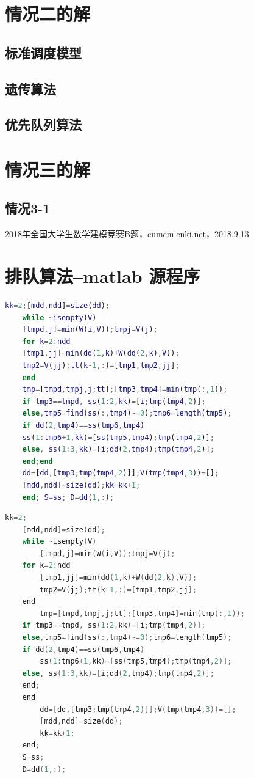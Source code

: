 \documentclass{cumcmthesis}
\begin{document}
	\section{情况二的解}
	\subsection{标准调度模型}
	\subsection{遗传算法}
	\subsection{优先队列算法}
	
	\section{情况三的解}
	\subsection{情况3-1}
	
	\begin{thebibliography}{9}
		 2018年全国大学生数学建模竞赛B题，cumcm.cnki.net，2018.9.13
	\end{thebibliography}
	
	\newpage
	\appendix
	\section{排队算法--matlab 源程序}
	\begin{lstlisting}[language=matlab]
	kk=2;[mdd,ndd]=size(dd);
	while ~isempty(V)
	[tmpd,j]=min(W(i,V));tmpj=V(j);
	for k=2:ndd
	[tmp1,jj]=min(dd(1,k)+W(dd(2,k),V));
	tmp2=V(jj);tt(k-1,:)=[tmp1,tmp2,jj];
	end
	tmp=[tmpd,tmpj,j;tt];[tmp3,tmp4]=min(tmp(:,1));
	if tmp3==tmpd, ss(1:2,kk)=[i;tmp(tmp4,2)];
	else,tmp5=find(ss(:,tmp4)~=0);tmp6=length(tmp5);
	if dd(2,tmp4)==ss(tmp6,tmp4)
	ss(1:tmp6+1,kk)=[ss(tmp5,tmp4);tmp(tmp4,2)];
	else, ss(1:3,kk)=[i;dd(2,tmp4);tmp(tmp4,2)];
	end;end
	dd=[dd,[tmp3;tmp(tmp4,2)]];V(tmp(tmp4,3))=[];
	[mdd,ndd]=size(dd);kk=kk+1;
	end; S=ss; D=dd(1,:);
	 \end{lstlisting}
	\begin{lstlisting}[language=c]
	kk=2;
	[mdd,ndd]=size(dd);
	while ~isempty(V)
		[tmpd,j]=min(W(i,V));tmpj=V(j);
	for k=2:ndd
		[tmp1,jj]=min(dd(1,k)+W(dd(2,k),V));
		tmp2=V(jj);tt(k-1,:)=[tmp1,tmp2,jj];
	end
		tmp=[tmpd,tmpj,j;tt];[tmp3,tmp4]=min(tmp(:,1));
	if tmp3==tmpd, ss(1:2,kk)=[i;tmp(tmp4,2)];
	else,tmp5=find(ss(:,tmp4)~=0);tmp6=length(tmp5);
	if dd(2,tmp4)==ss(tmp6,tmp4)
		ss(1:tmp6+1,kk)=[ss(tmp5,tmp4);tmp(tmp4,2)];
	else, ss(1:3,kk)=[i;dd(2,tmp4);tmp(tmp4,2)];
	end;
	end
		dd=[dd,[tmp3;tmp(tmp4,2)]];V(tmp(tmp4,3))=[];
		[mdd,ndd]=size(dd);
		kk=kk+1;
	end;
	S=ss;
	D=dd(1,:);
	 \end{lstlisting}
	
	
	
\end{document}
